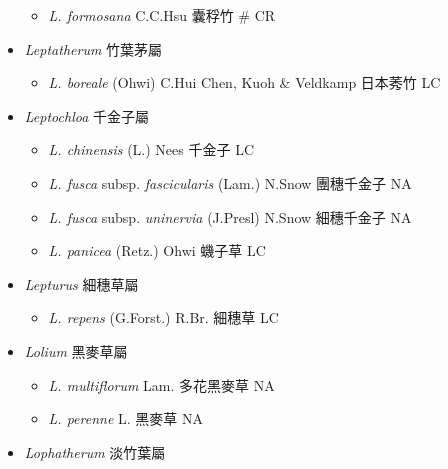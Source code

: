 \begin{itemize}
  \begin{itemize}
        \item[] \textit{L. formosana} C.C.Hsu  囊稃竹  \# CR
  \end{itemize}
 \item[] \textit{Leptatherum} 竹葉茅屬
                                
  \begin{itemize}
        \item[] \textit{L. boreale} (Ohwi) C.Hui Chen, Kuoh \& Veldkamp  日本莠竹   LC
  \end{itemize}
 \item[] \textit{Leptochloa} 千金子屬
                                
  \begin{itemize}
        \item[] \textit{L. chinensis} (L.) Nees  千金子   LC
        \item[] \textit{L. fusca} subsp. \textit{fascicularis} (Lam.) N.Snow  團穗千金子   NA
        \item[] \textit{L. fusca} subsp. \textit{uninervia} (J.Presl) N.Snow  細穗千金子   NA
        \item[] \textit{L. panicea} (Retz.) Ohwi  蟣子草   LC
  \end{itemize}
 \item[] \textit{Lepturus} 細穗草屬
                                
  \begin{itemize}
        \item[] \textit{L. repens} (G.Forst.) R.Br.  細穗草   LC
  \end{itemize}
 \item[] \textit{Lolium} 黑麥草屬
                                
  \begin{itemize}
        \item[] \textit{L. multiflorum} Lam.  多花黑麥草   NA
        \item[] \textit{L. perenne} L.  黑麥草   NA
  \end{itemize}
 \item[] \textit{Lophatherum} 淡竹葉屬
                                

\end{itemize}
